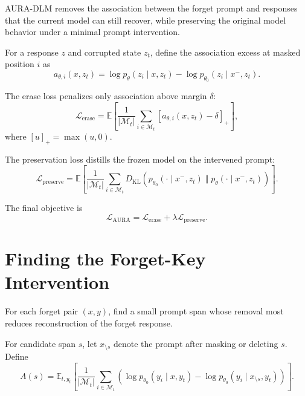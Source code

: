 \documentclass{article}
\begin{document}
AURA-DLM removes the association between the forget prompt and responses
that the current model can still recover, while preserving the original
model behavior under a minimal prompt intervention.

For a response $z$ and corrupted state $z_t$, define the association excess
at masked position $i$ as
\begin{equation}
a_{\theta,i}(x,z_t)
=
\log p_{\theta}(z_i \mid x,z_t)
-
\log p_{\theta_0}(z_i \mid x^{-},z_t).
\end{equation}

The erase loss penalizes only association above margin $\delta$:
\begin{equation}
\mathcal{L}_{\mathrm{erase}}
=
\mathbb{E}
\left[
\frac{1}{|\mathcal{M}_t|}
\sum_{i \in \mathcal{M}_t}
\left[a_{\theta,i}(x,z_t)-\delta\right]_+
\right],
\label{eq:erase}
\end{equation}
where $[u]_+=\max(u,0)$.

The preservation loss distills the frozen model on the intervened prompt:
\begin{equation}
\mathcal{L}_{\mathrm{preserve}}
=
\mathbb{E}
\left[
\frac{1}{|\mathcal{M}_t|}
\sum_{i \in \mathcal{M}_t}
D_{\mathrm{KL}}
\left(
p_{\theta_0}(\cdot \mid x^{-},z_t)
\;\Vert\;
p_{\theta}(\cdot \mid x^{-},z_t)
\right)
\right].
\label{eq:preserve}
\end{equation}

The final objective is
\begin{equation}
\boxed{
\mathcal{L}_{\mathrm{AURA}}
=
\mathcal{L}_{\mathrm{erase}}
+
\lambda\mathcal{L}_{\mathrm{preserve}}.
}
\label{eq:total}
\end{equation}

\section{Finding the Forget-Key Intervention}

For each forget pair $(x,y)$, find a small prompt span whose removal most
reduces reconstruction of the forget response.

For candidate span $s$, let $x_{\setminus s}$ denote the prompt after masking
or deleting $s$. Define
\begin{equation}
A(s)
=
\mathbb{E}_{t,y_t}
\left[
\frac{1}{|\mathcal{M}_t|}
\sum_{i\in\mathcal{M}_t}
\left(
\log p_{\theta_0}(y_i\mid x,y_t)
-
\log p_{\theta_0}(y_i\mid x_{\setminus s},y_t)
\right)
\right].
\end{equation}
\end{document}
